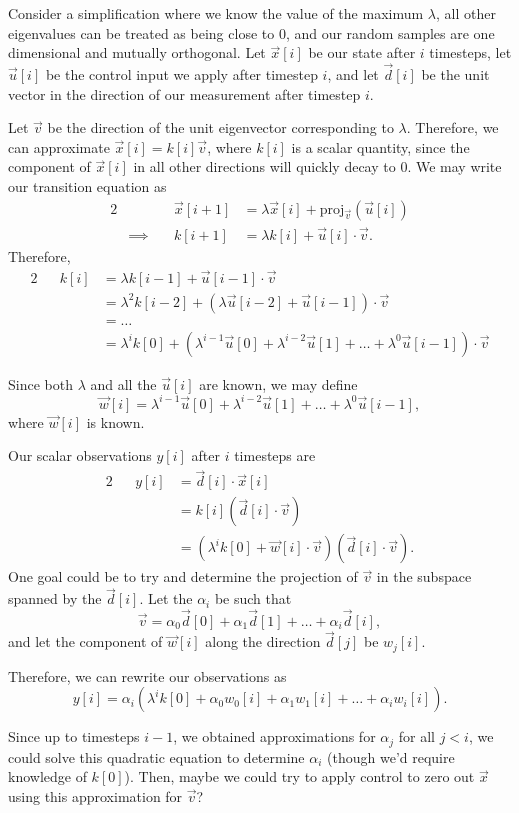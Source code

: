 \documentclass[letterpaper]{article}
\theoremstyle{remark}
\newcommand{\eqn}[1]{\begin{alignat*}{2}#1\end{alignat*}}
\newcommand*{\thus}{&\implies\quad&}
\begin{document}
Consider a simplification where we know the value of the maximum $\lambda$, all other eigenvalues can be treated as being close to $0$, and our random samples are one dimensional and mutually orthogonal. Let $\vec{x}[i]$ be our state after $i$ timesteps, let $\vec{u}[i]$ be the control input we apply after timestep $i$, and let $\vec{d}[i]$ be the unit vector in the direction of our measurement after timestep $i$.

Let $\vec{v}$ be the direction of the unit eigenvector corresponding to $\lambda$. Therefore, we can approximate $\vec{x}[i] = k[i]\vec{v}$, where $k[i]$ is a scalar quantity, since the component of $\vec{x}[i]$ in all other directions will quickly decay to $0$. We may write our transition equation as
\eqn{
    && \vec{x}[i + 1] &= \lambda \vec{x}[i] + \text{proj}_{\vec{v}}(\vec{u}[i]) \\
    \thus k[i + 1] &= \lambda k[i] + \vec{u}[i] \cdot \vec{v}.
}
Therefore,
\eqn{
    && k[i] &= \lambda k[i - 1] + \vec{u}[i - 1] \cdot \vec{v} \\
    &&&= \lambda^2 k[i-2] + (\lambda \vec{u}[i - 2] + \vec{u}[i - 1])\cdot \vec{v} \\
    &&&= \ldots \\
    &&&= \lambda^i k[0] + (\lambda^{i - 1} \vec{u}[0] + \lambda^{i - 2} \vec{u}[1] + \ldots + \lambda^0\vec{u}[i - 1])\cdot \vec{v}
}

Since both $\lambda$ and all the $\vec{u}[i]$ are known, we may define
\[
    \vec{w}[i] = \lambda^{i - 1} \vec{u}[0] + \lambda^{i - 2} \vec{u}[1] + \ldots + \lambda^0\vec{u}[i - 1],
\]
where $\vec{w}[i]$ is known.

Our scalar observations $y[i]$ after $i$ timesteps are
\eqn{
    && y[i] &= \vec{d}[i] \cdot \vec{x}[i] \\
    &&&= k[i] (\vec{d}[i]\cdot\vec{v}) \\
    &&&= (\lambda^i k[0] + \vec{w}[i] \cdot \vec{v})(\vec{d}[i] \cdot \vec{v}).
}
One goal could be to try and determine the projection of $\vec{v}$ in the subspace spanned by the $\vec{d}[i]$. Let the $\alpha_i$ be such that
\[
    \vec{v} = \alpha_0\vec{d}[0] + \alpha_1\vec{d}[1] + \ldots + \alpha_i\vec{d}[i],
\]
and let the component of $\vec{w}[i]$ along the direction $\vec{d}[j]$ be ${w}_j[i]$.

Therefore, we can rewrite our observations as
\[
    y[i] = \alpha_i(\lambda^i k[0] + \alpha_0{w}_0[i] + \alpha_1{w}_1[i] + \ldots + \alpha_i{w}_i[i]).
\]

Since up to timesteps $i - 1$, we obtained approximations for $\alpha_j$ for all $j < i$, we could solve this quadratic equation to determine $\alpha_i$ (though we'd require knowledge of $k[0]$). Then, maybe we could try to apply control to zero out $\vec{x}$ using this approximation for $\vec{v}$?
\end{document}
